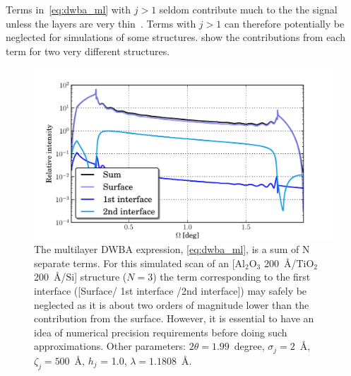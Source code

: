 \documentclass[10pt,twoside, b5paper,pdftex]{report}
\newcommand{\chem}[1]{\ensuremath{\mathrm{#1}}}
\begin{document}

Terms in~\cref{eq:dwba_ml} with $j>1$ seldom contribute much to the the signal unless the layers are very thin~\cite{HOLY}. Terms with $j>1$ can therefore potentially be neglected for simulations of some structures.  show the contributions from each term for two very different structures.
\begin{figure}[htbp]
	\begin{center}
		\includegraphics[width=1.0\textwidth]{figures/contributions.pdf}
	\end{center}
	\caption{The multilayer DWBA expression, \cref{eq:dwba_ml}, is a sum of N separate terms. For this simulated scan of an [\chem{Al_2O_3} \SI{200}{\angstrom}/\chem{TiO_2} \SI{200}{\angstrom}/\chem{Si}] structure ($N = 3$) the term corresponding to the first interface ([Surface/ 1st interface /2nd interface]) may safely be neglected as it is about two orders of magnitude lower than the contribution from the surface. However, it is essential to have an idea of numerical precision requirements before doing such approximations. Other parameters: $2\theta = 1.99$~\si{degree}, $\sigma_j = 2$~\si{\angstrom}, $\zeta_j = 500$~\si{\angstrom}, $h_j$ = 1.0, $\lambda = 1.1808$~\si{\angstrom}. \label{fig:contributions}}
\end{figure}
\end{document}
